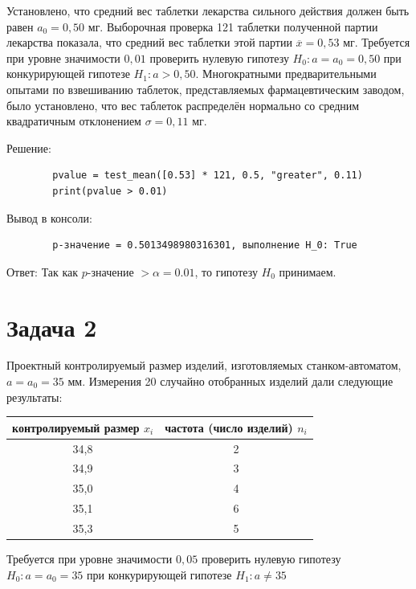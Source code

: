 \documentclass[a4paper,14pt]{extarticle}
\begin{document}
    Установлено, что средний вес таблетки лекарства сильного действия должен быть равен $a_0 = 0,50$ мг. 
    Выборочная проверка 121 таблетки полученной партии лекарства показала, что средний вес таблетки этой партии $\overline{x} = 0,53$ мг. 
    Требуется при уровне значимости $0,01$ проверить нулевую гипотезу $H_0: a = a_0 = 0,50$ при конкурирующей гипотезе $H_1: a > 0,50$. 
    Многократными предварительными опытами по взвешиванию таблеток, представляемых фармацевтическим заводом, было установлено, что вес таблеток распределён нормально со средним квадратичным отклонением $\sigma = 0,11$ мг.

    Решение:
    \begin{verbatim}
        pvalue = test_mean([0.53] * 121, 0.5, "greater", 0.11)
        print(pvalue > 0.01)
    \end{verbatim}

    Вывод в консоли:
    \begin{verbatim}
        p-значение = 0.5013498980316301, выполнение H_0: True
    \end{verbatim}

    Ответ: Так как $p$-значение $> \alpha = 0.01$, то гипотезу $H_0$ принимаем.

    \section{Задача 2}

    Проектный контролируемый размер изделий, изготовляемых станком-автоматом, $a = a_0 = 35$ мм. 
    Измерения 20 случайно отобранных изделий дали следующие результаты:
    \begin{table}[ht!]
        \centering
        \begin{tabular}{cc}
            \toprule
            \textbf{контролируемый размер} $x_i$ & \textbf{частота (число изделий)} $n_i$ \\
            \midrule
            34,8 & 2 \\
            34,9 & 3 \\
            35,0 & 4 \\
            35,1 & 6 \\
            35,3 & 5 \\
            \bottomrule
        \end{tabular}
    \end{table}

    Требуется при уровне значимости $0,05$ проверить нулевую гипотезу $H_0: a = a_0 = 35$ при конкурирующей гипотезе $H_1: a \neq 35$
\end{document}
